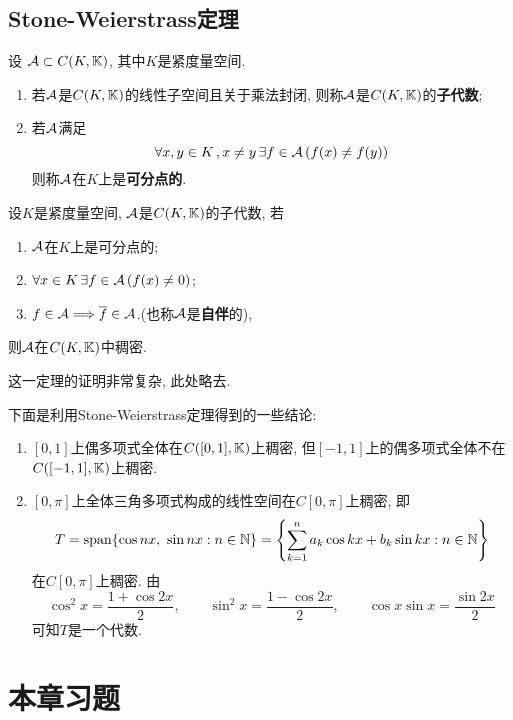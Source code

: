	\subsection{Stone-Weierstrass定理}

	\begin{Definition}
	设 $ \mathcal{A}\subset C(K,\mathbb{K}) $, 其中$ K $是紧度量空间.
	\begin{enumerate}[(1)]
	\item 若$ \mathcal{A} $是$ C(K,\mathbb{K}) $的线性子空间且关于乘法封闭, 则称$ \mathcal{A} $是$ C(K,\mathbb{K}) $的\textbf{子代数};
	\item 若$ \mathcal{A} $满足
	\[
	\forall x,y\in K\,,x\ne y\,\exists f\in\mathcal{A}\,(f(x)\ne f(y))
	\]
	则称$ \mathcal{A} $在$ K $上是\textbf{可分点的}.
	\end{enumerate}
	\end{Definition}

	\begin{Theorem}
	设$ K $是紧度量空间, $ \mathcal{A} $是$ C(K,\mathbb{K}) $的子代数, 若
	\begin{enumerate}[(1)]
	\item $ \mathcal{A} $在$ K $上是可分点的;
	\item $ \forall x\in K\,\exists f\in\mathcal{A}\,(f(x)\ne 0) $;
	\item $ f\in\mathcal{A}\Longrightarrow \overline{f}\in\mathcal{A} $.(也称$ \mathcal{A} $是\textbf{自伴}的),
	\end{enumerate}
	则$ \mathcal{A} $在$ C(K,\mathbb{K}) $中稠密.
	\end{Theorem}

	这一定理的证明非常复杂, 此处略去.

	\begin{Example}
	下面是利用Stone-Weierstrass定理得到的一些结论:
	\begin{enumerate}[(1)]
	\item $ [0,1] $上偶多项式全体在$ C([0,1],\mathbb{K}) $上稠密, 但$ [-1,1] $上的偶多项式全体不在$ C([-1,1],\mathbb{K}) $上稠密.
	\item $ [0,\pi] $上全体三角多项式构成的线性空间在$ C[0,\pi] $上稠密, 即
	\[
	T=\mathrm{span} \{ \cos nx,\ \sin nx : n\in\mathbb{N} \}=\left\{ \sum_{k=1}^na_k\cos kx+b_k\sin kx : n\in\mathbb{N} \right\}
	\]
	在$ C[0,\pi] $上稠密. 由
	\[
	\cos^2x=\frac{1+\cos 2x}{2},\qquad \sin^2x=\frac{1-\cos 2x}{2},\qquad \cos x\sin x=\frac{\sin 2x}{2}
	\]
	可知$ T $是一个代数.
	\end{enumerate}
	\end{Example}

	\section*{本章习题}

